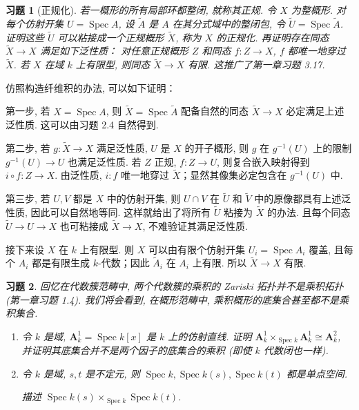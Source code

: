 \documentclass{article}
\theoremstyle{exercise}
\newtheorem{exercise}{习题}[section]
\newenvironment{proofc}{\proof}{\endproof}
\def\uA{\mathbf{A}}
\def\Spec{\operatorname{Spec}}
\begin{document}
\begin{exercise}[正规化]
  若一概形的所有局部环都整闭, 就称其\emph{正规}.
  令 $X$ 为整概形. 对每个仿射开集 $U = \Spec A$, 设 $\tilde{A}$ 是 $A$ 在其分式域中的整闭包,
  令 $\tilde{U} = \Spec \tilde{A}$. 证明这些 $\tilde{U}$ 可以粘接成一个正规概形 $\tilde{X}$,
  称为 $X$ 的\emph{正规化}.
  再证明存在同态 $\tilde{X} \to X$ 满足如下泛性质：
  对任意正规概形 $Z$ 和同态 $f \colon Z \to X$, $f$ 都唯一地穿过 $\tilde{X}$.
  若 $X$ 在域 $k$ 上有限型, 则同态 $\tilde{X} \to X$ 有限.
  这推广了第一章习题 3.17.
\end{exercise}

\begin{proofc}
  仿照构造纤维积的办法, 可以如下证明：

  第一步, 若 $X = \Spec A$, 则 $\tilde{X} = \Spec \tilde{A}$
  配备自然的同态 $\tilde{X} \to X$ 必定满足上述泛性质.
  这可以由习题 2.4 自然得到.

  第二步, 若 $g \colon \tilde{X} \to X$ 满足泛性质,
  $U$ 是 $X$ 的开子概形, 则 $g$ 在 $g^{-1}(U)$ 上的限制 $g^{-1}(U) \to U$ 也满足泛性质.
  若 $Z$ 正规, $f \colon Z \to U$, 则复合嵌入映射得到 $i \circ f \colon Z \to X$.
  由泛性质, $i \colon f$ 唯一地穿过 $\tilde{X}$；显然其像集必定包含在 $g^{-1}(U)$ 中.

  第三步, 若 $U, V$ 都是 $X$ 中的仿射开集, 则 $U \cap V$ 在 $\tilde{U}$ 和 $\tilde{V}$
  中的原像都具有上述泛性质, 因此可以自然地等同.
  这样就给出了将所有 $\tilde{U}$ 粘接为 $\tilde{X}$ 的办法.
  且每个同态 $\tilde{U} \to U \to X$ 也可粘接成 $\tilde{X} \to X$,
  不难验证其满足泛性质.

  接下来设 $X$ 在 $k$ 上有限型. 则 $X$ 可以由有限个仿射开集 $U_i = \Spec A_i$ 覆盖,
  且每个 $A_i$ 都是有限生成 $k$-代数；因此 $\tilde{A}_i$ 在 $A_i$ 上有限.
  所以 $\tilde{X} \to X$ 有限.
\end{proofc}

\begin{exercise}
  回忆在代数簇范畴中, 两个代数簇的乘积的 Zariski 拓扑并不是乘积拓扑 (第一章习题 1.4).
  我们将会看到, 在概形范畴中, 乘积概形的底集合甚至都不是乘积集合.
  \begin{enumerate}[label={(\alph*)}]
    \item 令 $k$ 是域, $\uA_k^1 = \Spec k[x]$ 是 $k$ 上的仿射直线.
          证明 $\uA_k^1 \times_{\Spec k} \uA_k^1 \cong \uA_k^2$,
          并证明其底集合并不是两个因子的底集合的乘积 (即使 $k$ 代数闭也一样).
    \item 令 $k$ 是域, $s, t$ 是不定元, 则 $\Spec k, \Spec k(s), \Spec k(t)$
          都是单点空间.

          描述 $\Spec k(s) \times_{\Spec k} \Spec k(t)$.
  \end{enumerate}
\end{exercise}
\end{document}
